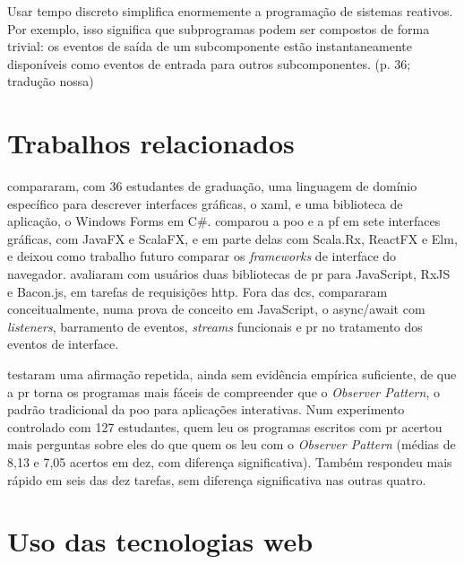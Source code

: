 \begin{citacao}
  Usar tempo discreto simplifica enormemente a programação de sistemas reativos.
  Por exemplo, isso significa que subprogramas podem ser compostos de forma
  trivial: os eventos de saída de um subcomponente estão instantaneamente
  disponíveis como eventos de entrada para outros subcomponentes.
  (p. 36; tradução nossa)
\end{citacao}
\section{Trabalhos relacionados}
\label{sec:trabalhos-relacionados}

\textcite{mernik2009} compararam, com 36 estudantes de graduação, uma linguagem de
domínio específico para descrever interfaces gráficas, o \gls{xaml}, e uma biblioteca de
aplicação, o Windows Forms em C\#.
\textcite[p. v, 11 e 104]{kiss2014} comparou a \gls{poo} e a \gls{pf}
em sete interfaces gráficas, com JavaFX e ScalaFX, e em parte delas com
Scala.Rx, ReactFX e Elm, e deixou como trabalho futuro comparar os
\emph{frameworks} de interface do navegador.
\textcite[p. 1510 e 1513]{zimmerle2025} avaliaram com usuários duas
bibliotecas de \gls{pr} para JavaScript, RxJS e Bacon.js, em tarefas de
requisições \gls{http}.
Fora das \glspl{dc}, \textcite[p. 15]{grolaux2026} compararam
conceitualmente, numa prova de conceito em JavaScript, o async/await com
\emph{listeners}, barramento de eventos, \emph{streams} funcionais e \gls{pr} no tratamento
dos eventos de interface.

\textcite[p. 1125-1134]{salvaneschi2017} testaram uma afirmação repetida,
ainda sem evidência empírica suficiente, de que a \gls{pr} torna os programas
mais fáceis de compreender que o \emph{Observer Pattern}, o padrão tradicional da
\gls{poo} para aplicações interativas.
Num experimento controlado com 127 estudantes, quem leu os programas escritos
com \gls{pr} acertou mais perguntas sobre eles do que quem os leu com o
\emph{Observer Pattern} (médias de 8,13 e 7,05 acertos em dez, com diferença
significativa).
Também respondeu mais rápido em seis das dez tarefas, sem diferença
significativa nas outras quatro.
\section{Uso das tecnologias web}
\label{sec:uso-das-tecnologias-web}

